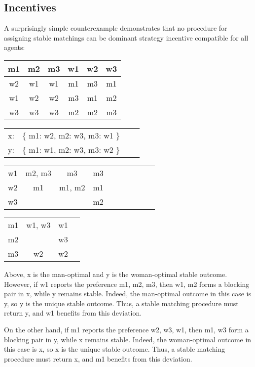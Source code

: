 \documentclass[12pt]{article}
\begin{document}
\subsection{Incentives}

  A surprisingly simple counterexample demonstrates that no procedure for
  assigning stable matchings can be dominant strategy incentive compatible for
  all agents:

  \begin{tabular}{ccc|ccc}
    m1 & m2 & m3 & w1 & w2 & w3 \\
    \hline
    w2 & w1 & w1 & m1 & m3 & m1 \\
    w1 & w2 & w2 & m3 & m1 & m2 \\
    w3 & w3 & w3 & m2 & m2 & m3 \\
  \end{tabular}
  \quad
  \begin{tabular}{cccc}
    x: & \{ m1: w2, m2: w3, m3: w1 \} \\
    y: & \{ m1: w1, m2: w3, m3: w2 \}
  \end{tabular}

  \quad
  \begin{tabular}{c|ccccccccc}
    \hline
       w1 & m2, m3 & m3 & m3
    \\ w2 & m1 & m1, m2 & m1
    \\ w3 & & & m2
  \end{tabular}
  \quad
  \begin{tabular}{c|ccc}
    \hline
       m1 & w1, w3 & w1
    \\ m2 &  & w3
    \\ m3 & w2 & w2
  \end{tabular}

  Above, x is the man-optimal and y is the woman-optimal stable outcome.
  However, if w1 reports the preference m1, m2, m3, then
  w1, m2 forms a blocking pair in x, while y remains stable.
  Indeed, the man-optimal outcome in this case is y,
  so y is the unique stable outcome.
  Thus, a stable matching procedure must return y,
  and w1 benefits from this deviation.

  On the other hand, if m1 reports the preference w2, w3, w1,
  then m1, w3 form a blocking pair in y, while x remains stable.
  Indeed, the woman-optimal outcome in this case is x,
  so x is the unique stable outcome.
  Thus, a stable matching procedure must return x,
  and m1 benefits from this deviation.

\end{document}
